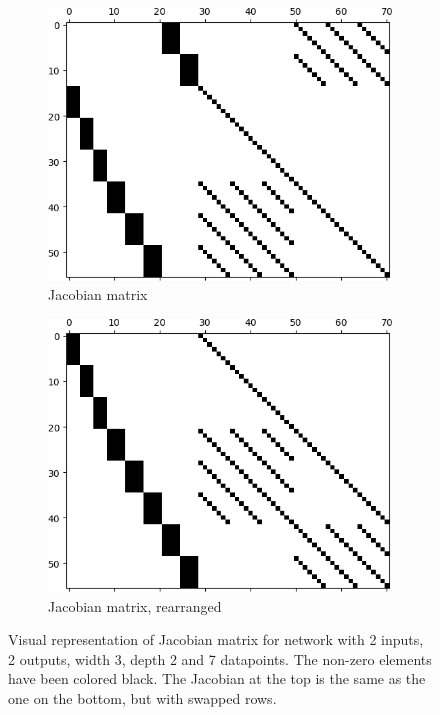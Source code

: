 \begin{figure}[b]
	\centering
	\begin{subfigure}{\textwidth}
	  \centering
	  \includegraphics[width=\textwidth]{jac0.png}
	  \caption{Jacobian matrix}
	  \label{jac}
	\end{subfigure}
	\begin{subfigure}{\textwidth}
	  \centering
	  \includegraphics[width=\textwidth]{jac1.png}
	  \caption{Jacobian matrix, rearranged}
	  \label{jac2}
	\end{subfigure}
	\caption{Visual representation of Jacobian matrix for network with 2 inputs, 2 outputs, width 3, depth 2 and 7 datapoints. The non-zero elements have been colored black. The Jacobian at the top is the same as the one on the bottom, but with swapped rows.}
	\label{jactot}
\end{figure}

